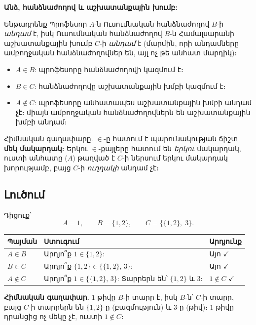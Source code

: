 \documentclass[12pt, a4paper]{article}
\begin{document}
\begin{tcolorbox}[colback=yellow!5, colframe=stmtFrame!80!black, arc=2mm, left=5pt, right=5pt, top=5pt, bottom=5pt, title={\small Իրական աշխարհի անալոգիա. Մակարդակների թռիչքներ}]
\textbf{Անձ, հանձնաժողով և աշխատանքային խումբ:}

Ենթադրենք Պրոֆեսոր $A$-ն Ուսումնական հանձնաժողով $B$-ի \emph{անդամ} է, իսկ Ուսումնական հանձնաժողով $B$-ն Համալսարանի աշխատանքային խումբ $C$-ի \emph{անդամ} է (մարմին, որի անդամները ամբողջական հանձնաժողովներ են, այլ ոչ թե անհատ մարդիկ)։

\begin{itemize}[nosep]
  \item $A \in B$: պրոֆեսորը հանձնաժողովի կազմում է։
  \item $B \in C$: հանձնաժողովը աշխատանքային խմբի կազմում է։
  \item $A \notin C$: պրոֆեսորը անհատապես աշխատանքային խմբի անդամ \textbf{չէ}։ միայն ամբողջական հանձնաժողովներն են աշխատանքային խմբի անդամ։
\end{itemize}

Հիմնական գաղափարը. $\in$-ը հատում է պարունակության ճիշտ \textbf{մեկ մակարդակ}։ Երկու $\in$-քայլերը հատում են \emph{երկու} մակարդակ, ուստի անհատը ($A$) թաղված է $C$-ի ներսում երկու մակարդակ խորությամբ, բայց $C$-ի \emph{ուղղակի} անդամ չէ։
\end{tcolorbox}

\subsection*{Լուծում}
Դիցուք՝
\[
  A = 1, \qquad B = \{1, 2\}, \qquad C = \bigl\{\{1, 2\},\; 3\bigr\}.
\]

\begin{center}
\renewcommand{\arraystretch}{1.4}
\begin{tabular}{lll}
\toprule
\textbf{Պայման} & \textbf{Ստուգում} & \textbf{Արդյունք} \\
\midrule
$A \in B$ & Արդյո՞ք $1 \in \{1, 2\}$: & Այո $\checkmark$ \\
$B \in C$ & Արդյո՞ք $\{1,2\} \in \bigl\{\{1,2\},\, 3\bigr\}$: & Այո $\checkmark$ \\
$A \notin C$ & Արդյո՞ք $1 \in \bigl\{\{1,2\},\, 3\bigr\}$:
  Տարրերն են՝ $\{1,2\}$ և $3$: & $1 \notin C$ \;$\checkmark$ \\
\bottomrule
\end{tabular}
\end{center}

\textbf{Հիմնական գաղափար.}\;
$1$ թիվը $B$-ի տարր է, իսկ $B$-ն՝ $C$-ի տարր,
բայց $C$-ի տարրերն են $\{1,2\}$-ը (բազմություն) և $3$-ը (թիվ)։
$1$ թիվը դրանցից ոչ մեկը չէ, ուստի $1 \notin C$։
\end{document}
